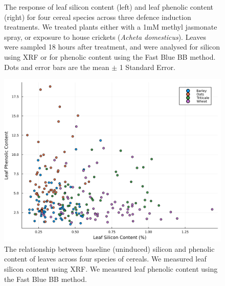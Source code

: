 \documentclass[12pt, letterpaper, ]{report}
\begin{document}
\begin{figure}[h]
\begin{subfigure}[b]{0.45\textwidth}
        \end{subfigure}
        \caption{The response of leaf silicon content (left) and leaf phenolic content (right) for four cereal species across three defence induction treatments. We treated plants either with a 1mM methyl jasmonate spray, or exposure to house crickets (\textit{Acheta domesticus}). Leaves were sampled 18 hours after treatment, and were analysed for silicon using XRF or for phenolic content using the Fast Blue BB method. Dots and error bars are the mean $\pm$ 1 Standard Error.}
        \label{Fig:induction}
\end{figure}



\begin{figure}[h]
        \includegraphics[width = \textwidth]{images/phenolic_silicon_regression.png}
        \centering
        \caption{The relationship between baseline (uninduced) silicon and phenolic content of leaves across four species of cereals. We measured leaf silicon content using XRF. We measured leaf phenolic content using the Fast Blue BB method.}
        \label{Fig:phe_si_scatter}
\end{figure}
\clearpage
\end{document}
